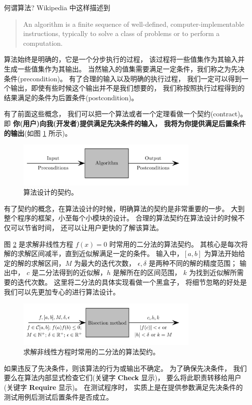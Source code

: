 
何谓算法? Wikipedia 中这样描述到
\begin{quotation}
	An algorithm is a finite sequence of well-defined, 
	computer-implementable instructions, 
	typically to solve a class of problems or to perform a computation.
\end{quotation}
算法始终是明确的，它是一个分步执行的过程，
该过程将一些值集作为其输入并生成一些值集作为其输出。
当然输入的值集需要满足一定条件，我们称之为先决条件(precondition)。
有了合理的输入以及明确的执行过程，
我们一定可以得到一个输出，即使有些时候这个输出并不是我们想要的，
我们称按照执行过程得到的结果满足的条件为后置条件(postcondition)。

有了前面这些概念，
我们可以把一个算法或者一个定理看做一个契约(contract)。
即
\textbf{你(用户)向我(开发者)提供满足先决条件的输入，
我将为你提供满足后置条件的输出}(如图 \ref{fig:contract} 所示)。
\begin{figure}[htbp]
	\centering
	\includegraphics[width=0.8\textwidth]{png/contract}
	\caption{算法设计的契约。}
	\label{fig:contract}
\end{figure}
有了契约的概念，在算法设计的时候，明确算法的契约是非常重要的一步。
大到整个程序的框架，小至每个小模块的设计。
合理的算法契约在算法设计的时候不仅可以节省时间，
还可以让用户更快的了解该算法。

图 \ref{fig:bisection} 是求解非线性方程 $f(x)=0$ 时常用的二分法的算法契约。
其核心是每次将解的求解区间减半，直到近似解满足一定的条件。
输入中，$[a,b]$ 为算法开始给定的解的求解区间，$M$ 为最大的迭代次数，
$\epsilon, \delta $ 是两种不同的解的精度范围；
输出中， $c$ 是二分法得到的近似解，$h$ 是解所在的区间范围，
$k$ 为找到近似解所需要的迭代次数。
这里将二分法的具体实现看做一个黑盒子，
将细节忽略的好处是我们可以先更加专心的进行算法设计。
\begin{figure}[htbp]
	\centering
	\includegraphics[width=0.8\textwidth]{png/bisectionMethod}
	\caption{求解非线性方程时常用的二分法的算法契约。}
	\label{fig:bisection}
\end{figure}
	
如果违反了先决条件，则该算法的行为或输出不确定。
为了确保先决条件，
我们要么在算法内部显式检查它们(关键字 \textbf{Check} 显示)，
要么将此职责转移给用户(关键字 \textbf{Require} 显示)。 
在测试程序时，
实质上是在提供参数满足先决条件的测试用例后测试后置条件是否成立。


